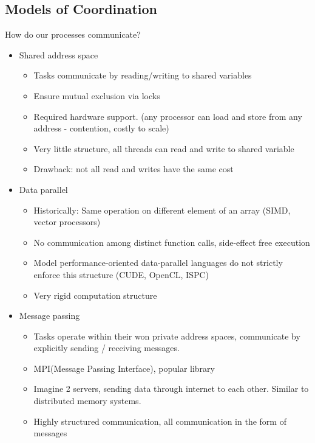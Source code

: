 \documentclass{article}
\begin{document}
\subsection{Models of Coordination}
How do our processes communicate?
\begin{itemize}
    \item Shared address space
          \begin{itemize}
              \item Tasks communicate by reading/writing to shared variables
              \item Ensure mutual exclusion via locks
              \item Required hardware support. (any processor can load and store from any address - contention, costly to scale)
              \item Very little structure, all threads can read and write to shared variable
              \item Drawback: not all read and writes have the same cost
          \end{itemize}
    \item Data parallel
          \begin{itemize}
              \item Historically: Same operation on different element of an array (SIMD, vector processors)
              \item No communication among distinct function calls, side-effect free execution
              \item Model performance-oriented data-parallel languages do not strictly enforce this structure (CUDE, OpenCL, ISPC)
              \item Very rigid computation structure
          \end{itemize}
    \item Message passing
          \begin{itemize}
              \item Tasks operate within their won private address spaces, communicate by explicitly sending / receiving messages.
              \item MPI(Message Passing Interface), popular library
              \item Imagine 2 servers, sending data through internet to each other. Similar to distributed memory systems.
              \item Highly structured communication, all communication in the form of messages
          \end{itemize}
\end{itemize}
\end{document}
